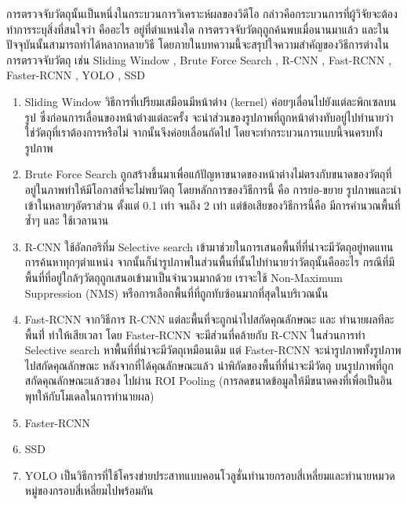 การตรวจจับวัตถุนั้นเป็นหนึ่งในกระบวนการวิเคราะห์ผลของวิดีโอ กล่าวคือกระบวนการที่ผู้วิจัยจะต้องทำการระบุสิ่งที่สนใจว่า คืออะไร อยู่ที่ตำแหน่งใด 	การตรวจจับวัตถุถูกค้นพบเมื่อนานมาแล้ว และในปัจจุบันนั้นสามารถทำได้หลากหลายวิธี โดยภายในบทความนี้จะสรุปใจความสำคัญของวิธีการต่างในการตรวจจับวัตถุ เช่น Sliding Window , Brute Force Search , R-CNN , Fast-RCNN , Faster-RCNN , YOLO , SSD 
\begin{enumerate}
	\item Sliding Window วิธีการที่เปรียมเสมือนมีหน้าต่าง (kernel) ค่อยๆเลื่อนไปยังแต่ละพิกเซลบนรูป ซึ่งก่อนการเลื่อนของหน้าต่างแต่ละครั้ง จะนำส่วนของรูปภาพที่ถูกหน้าต่างทับอยู่ไปทำนายว่าใช่วัตถุที่เราต้องการหรือไม่ จากนั้นจึงค่อยเลื่อนถัดไป โดยจะทำกระบวนการแบบนี้จนครบทั้งรูปภาพ
	\item Brute Force Search ถูกสร้างขึ้นมาเพื่อแก้ปัญหาขนาดของหน้าต่างไม่ตรงกับขนาดของวัตถุที่อยู่ในภาพทำให้มีโอกาสที่จะไม่พบวัตถุ โดยหลักการของวิธีการนี้ คือ การย่อ-ขยาย รูปภาพและนำเข้าในหลายๆอัตราส่วน ตั้งแต่ 0.1 เท่า จนถึง 2 เท่า แต่ข้อเสียของวิธีการนี้คือ มีการคำนวณพื้นที่ซ้ำๆ และ ใช้เวลานาน
	\item R-CNN ใช้อัลกอริทึ่ม Selective search เข้ามาช่วยในการเสนอพื้นที่ที่น่าจะมีวัตถุอยู่ทดแทนการค้นหาทุกๆตำแหน่ง จากนั้นก็นำรูปภาพในส่วนพื้นที่นั้นไปทำนายว่าวัตถุนั้นคืออะไร กรณีที่มีพื้นที่ที่อยู่ใกล้ๆวัตถุถูกเสนอเข้ามาเป็นจำนวนมากด้วย เราจะใช้ Non-Maximum Suppression (NMS) หรือการเลือกพื้นที่ที่ถูกทับซ้อนมากที่สุดในบริเวณนั้น
	\item Fast-RCNN จากวิธีการ R-CNN แต่ละพื้นที่จะถูกนำไปสกัดคุณลักษณะ และ ทำนายผลทีละพื้นที่่ ทำให้เสียเวลา โดย Faster-RCNN จะมีส่วนที่คล้ายกับ R-CNN ในส่วนการทำ Selective search หาพื้นที่ที่น่าจะมีวัตถุเหมือนเดิม แต่ Faster-RCNN จะนำรูปภาพทั้งรูปภาพไปสกัดคุณลักษณะ หลังจากที่ได้คุณลักษณะแล้ว นำพิกัดของพื้นที่ที่น่าจะมีวัตถุ บนรูปภาพที่ถูกสกัดคุณลักษณะแล้วของ ไปผ่าน ROI Pooling (การลดขนาดข้อมูลให้มีขนาดคงที่เพื่อเป็นอินพุทให้กับโมเดลในการทำนายผล)
	\item Faster-RCNN 
	\item SSD
	\item YOLO เป็นวิธีการที่ใช้โครงข่ายประสาทแบบคอนโวลูชั่นทำนายกรอบสี่เหลี่ยมและทำนายหมวดหมู่ของกรอบสี่เหลี่ยมไปพร้อมกัน 


\end{enumerate}

 





